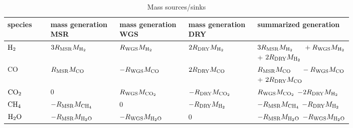 \documentclass[preprint,12pt]{elsarticle}
\begin{document}
 \begin{table}
\renewcommand{\arraystretch}{1.7}
\caption{Mass sources/sinks}
\label{tab:mass_source}       
\centering
\begin{tabular}{l||p{0.2\linewidth}|p{0.2\linewidth}|p{0.2\linewidth}|p{0.2\linewidth}}

\toprule

species & mass generation MSR  & mass generation WGS  & mass generation DRY & summarized \linebreak  generation \\

\midrule

$\rm{H}_2$ & $3R_{\rm{MSR}}M_{\rm{H_2}}$ & $R_{\rm{WGS}}M_{\rm{H_2}}$ & $2R_{\rm{DRY}}M_{\rm{H_2}}$ & $3R_{\rm{MSR}}M_{\rm{H_2}}\linebreak\indent +R_{\rm{WGS}}M_{\rm{H_2}}$ \linebreak\indent + $2R_{\rm{DRY}}M_{\rm{H_2}}$ \\

\noalign{\smallskip}\hline\noalign{\smallskip}

CO & $R_{\rm{MSR}}M_{\rm{CO}}$ & $-R_{\rm{WGS}}M_{\rm{CO}}$ & $2R_{\rm{DRY}}M_{\rm{CO}}$ & $R_{\rm{MSR}}M_{\rm{CO}} \linebreak\indent -R_{\rm{WGS}}M_{\rm{CO}}$  + $2R_{\rm{DRY}}M_{\rm{CO}}$\\

\noalign{\smallskip}\hline\noalign{\smallskip}

$\rm{CO_2}$ & 0 & $R_{\rm{WGS}}M_{\rm{CO_2}}$ & $-R_{\rm{DRY}}M_{\rm{CO_2}}$ & $R_{\rm{WGS}}M_{\rm{CO_2}}$ \linebreak\indent $-2R_{\rm{DRY}}M_{\rm{H_2}}$ \\

\noalign{\smallskip}\hline\noalign{\smallskip}

$\rm{CH_4}$ & $-R_{\rm{MSR}}M_{\rm{CH_4}}$ & 0 & $-R_{\rm{DRY}}M_{\rm{H_2}}$ & $-R_{\rm{MSR}}M_{\rm{CH_4}}$ \linebreak $-R_{\rm{DRY}}M_{\rm{H_2}}$ \\

\noalign{\smallskip}\hline\noalign{\smallskip}

$\rm{H_2O}$ & $-R_{\rm{MSR}}M_{\rm{H_2O}}$ & $-R_{\rm{WGS}}M_{\rm{H_2O}}$ & 0 & $-R_{\rm{MSR}}M_{\rm{H_2O}}$ 
$-R_{\rm{WGS}}M_{\rm{H_2O}}$ \\
\bottomrule

\end{tabular}
\end{table}
\end{document}
